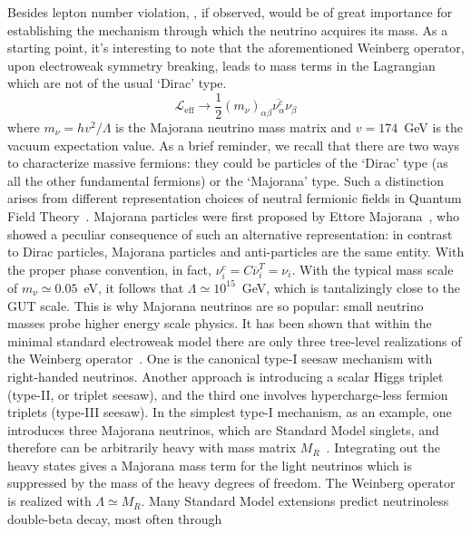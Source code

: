 Besides lepton number violation, \onbb, if observed, would be of great importance for
establishing the mechanism through which the neutrino acquires its mass. As a starting
point, it's interesting to note that the aforementioned Weinberg operator, upon
electroweak symmetry breaking, leads to mass terms in the Lagrangian which are not of the
usual `Dirac' type.
\begin{equation}\label{eq:nbb:wein-sb}
  \mathcal{L}_\text{eff} \longrightarrow \frac{1}{2} {(m_\nu)}_{\alpha\beta}
                                         \overline{\nu_\alpha^c} \nu_\beta
\end{equation}
where $m_\nu = h v^2 / \Lambda$ is the Majorana neutrino mass matrix and $v = 174$~GeV is
the vacuum expectation value.  As a brief reminder, we recall that there are two ways to
characterize massive fermions: they could be particles of the `Dirac' type (as all the
other fundamental fermions) or the `Majorana' type.  Such a distinction arises from
different representation choices of neutral fermionic fields in Quantum Field
Theory~\cite{Giunti2007}.  Majorana particles were first proposed by Ettore
Majorana~\cite{Majorana1932}, who showed a peculiar consequence of such an alternative
representation: in contrast to Dirac particles, Majorana particles and anti-particles are
the same entity. With the proper phase convention, in fact, $\nu_i^c = C\overline{\nu}^T_i =
\nu_i$. With the typical mass scale of $m_\nu \simeq 0.05$~eV, it follows that $\Lambda
\simeq 10^{15}$~GeV, which is tantalizingly close to the GUT scale. This is why Majorana
neutrinos are so popular: small neutrino masses probe higher energy scale physics. It has
been shown that within the minimal standard electroweak model there are only three
tree-level realizations of the Weinberg operator~\cite{Ma1998}.  One is the canonical
type-I seesaw mechanism with right-handed neutrinos.  Another approach is introducing a
scalar Higgs triplet (type-II, or triplet seesaw), and the third one involves
hypercharge-less fermion triplets (type-III seesaw).  In the simplest type-I mechanism, as
an example, one introduces three Majorana neutrinos, which are Standard Model singlets,
and therefore can be arbitrarily heavy with mass matrix $M_R$~\cite{Mohapatra1979}.
Integrating out the heavy states gives a Majorana mass term for the light neutrinos which
is suppressed by the mass of the heavy degrees of freedom. The Weinberg operator is
realized with $\Lambda \simeq M_R$.
\newpar
Many Standard Model extensions predict neutrinoless double-beta decay, most often through
